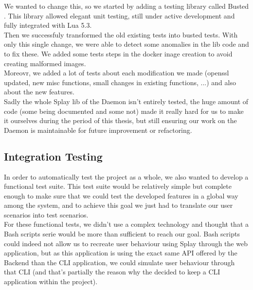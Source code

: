 \documentclass{eplmastersthesis}
\begin{document}
        We wanted to change this, so we started by adding a testing library
        called Busted \cite{busted}. This library allowed elegant unit testing,
        still under active development and fully integrated with Lua 5.3.\\
        Then we successfuly transformed the old existing tests into busted
        tests. With only this single change, we were able to detect some
        anomalies in the lib code and to fix these. We added some tests steps
        in the docker inage creation to avoid creating malformed images.\\

        Moreovr, we added a lot of tests about each modification we made
        (openssl updated, new misc functions, small changes in existing
        functions, ...) and also about the new features.\\
        Sadly the whole Splay lib of the Daemon isn't entirely tested,
        the huge amount of code (some being documented and some not) made it
        really hard for us to make it ourselves during the period of this
        thesis, but still ensuring our work on the Daemon is maintainable
        for future improvement or refactoring.

      \subsection{Integration Testing}

        In order to automatically test the project as a whole, we also wanted to
        develop a functional test suite. This test suite would be relatively
        simple but complete enough to make sure that we could test the developed
        features in a global way among the system, and to achieve this goal we
        just had to translate our user scenarios into test scenarios.\\

        For these functional tests, we didn't use a complex technology and
        thought that a Bash scripts serie would be more than sufficient to
        reach our goal. Bash scripts could indeed not allow us to recreate user
        behaviour using Splay through the web application, but as this
        application is using the exact same API offered by the Backend than the
        CLI application, we could simulate user behaviour through that CLI (and
        that's partially the reason why the decided to keep a CLI application
        within the project).\\
\end{document}
